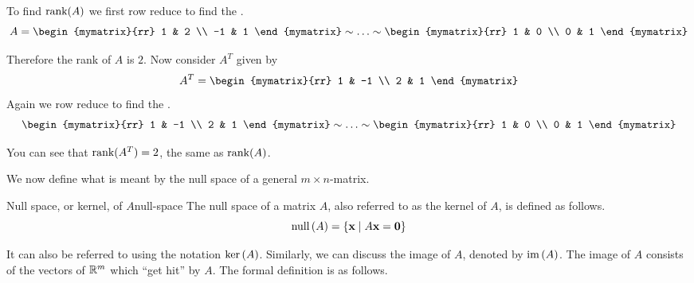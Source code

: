 \begin{solution}
  To find $\mbox{\rm rank}(A)$ we first row reduce to find the {\rref}.
  \begin{equation*}
    A =
    \begin{mymatrix}{rr}
      1 & 2 \\
      -1 & 1
    \end{mymatrix}
    \sim\ldots\sim
    \begin{mymatrix}{rr}
      1 & 0 \\
      0 & 1
    \end{mymatrix}
  \end{equation*}

  Therefore the rank of $A$ is $2$. Now consider $A^T$ given by
  \begin{equation*}
    A^T = \begin{mymatrix}{rr}
      1 & -1 \\
      2 & 1
    \end{mymatrix}
  \end{equation*}
  Again we row reduce to find the {\rref}.
  \begin{equation*}
    \begin{mymatrix}{rr}
      1 & -1 \\
      2 & 1
    \end{mymatrix}
    \sim\ldots\sim
    \begin{mymatrix}{rr}
      1 & 0 \\
      0 & 1
    \end{mymatrix}
  \end{equation*}

  You can see that $\mbox{\rm rank}(A^T) = 2$, the same as $\mbox{\rm rank}(A)$.
\end{solution}

We now define what is meant by the null space of a general
$m\times n$-matrix.

\begin{definition}{Null space, or kernel, of $A$}{null-space}
  The null space of a matrix $A$, also referred to as the kernel of
  $A$, is defined as follows.%
  \begin{equation*}
    \mbox{\rm null} \left(A\right) =\left\{\mbox{\bf x} \mid A \mbox{\bf x} =\mbox{\bf 0}\right\}
  \end{equation*}
\end{definition}

It can also be referred to using the notation $\ker \left( A\right)$.
Similarly, we can discuss the image of $A$, denoted by
$\mbox{\rm im}\left(A\right)$. The image of $A$ consists of the vectors of
$\mathbb{R}^{m}$ which ``get hit'' by $A$.  The formal definition is as
follows.

